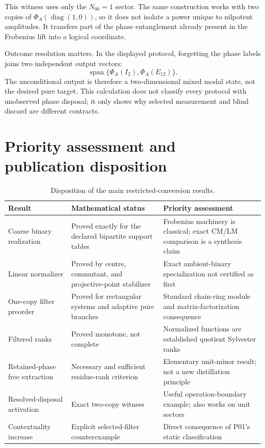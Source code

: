 \documentclass[11pt]{article}
\theoremstyle{definition}
\theoremstyle{remark}
\newcommand{\Span}{\operatorname{span}}
\newcommand{\diag}{\operatorname{diag}}
\begin{document}
This witness uses only the $N_{00}=1$ sector. The same construction works with two copies of $\Phi_A(\diag(1,0))$, so it does not isolate a power unique to nilpotent amplitudes. It transfers part of the phase entanglement already present in the Frobenius lift into a logical coordinate.

Outcome resolution matters. In the displayed protocol, forgetting the phase labels joins two independent output vectors:
\[
  \Span\{\Phi_A(I_2),\Phi_A(E_{12})\}.
\]
The unconditional output is therefore a two-dimensional mixed modal state, not the desired pure target. This calculation does not classify every protocol with unobserved phase disposal; it only shows why selected measurement and blind discard are different contracts.

\section{Priority assessment and publication disposition}

\begin{table}[htbp]
\centering
\small
\caption{Disposition of the main restricted-conversion results.}
\label{tab:priority}
\begin{tabularx}{\textwidth}{@{}p{}YY@{}}
\toprule
Result & Mathematical status & Priority assessment \\
\midrule
Coarse binary realization & Proved exactly for the declared bipartite support tables & Frobenius machinery is classical; exact CM/LM comparison is a synthesis claim \\
Linear normalizer & Proved by centre, commutant, and projective-point stabilizer & Exact ambient-binary specialization not certified as first \\
One-copy filter preorder & Proved for rectangular systems and adaptive pure branches & Standard chain-ring module and matrix-factorization consequence \\
Filtered ranks & Proved monotone, not complete & Normalized functions are established quotient Sylvester ranks \\
Retained-phase free extraction & Necessary and sufficient residue-rank criterion & Elementary unit-minor result; not a new distillation principle \\
Resolved-disposal activation & Exact two-copy witness & Useful operation-boundary example; also works on unit sectors \\
Contextuality increase & Explicit selected-filter counterexample & Direct consequence of P01's static classification \\
\bottomrule
\end{tabularx}
\end{table}
\end{document}
